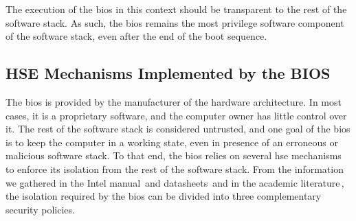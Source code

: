 The execution of the \ac{bios} in this context should be transparent to the rest
of the software stack.
%
As such, the \ac{bios} remains the most privilege software component of the
software stack, even after the end of the boot sequence.

\subsection{HSE Mechanisms Implemented by the BIOS}
\label{subsec:usecase:firm:sec}

The \ac{bios} is provided by the manufacturer of the hardware architecture.
%
In most cases, it is a proprietary software, and the computer owner has little
control over it.
%
The rest of the software stack is considered untrusted, and one goal of the
\ac{bios} is to keep the computer in a working state, even in presence of an
erroneous or malicious software stack.
%
To that end, the \ac{bios} relies on several \ac{hse} mechanisms to enforce its
isolation from the rest of the software stack.
%
%
From the information we gathered in the Intel manual\,\cite{intel2014manual} and
datasheets\,\cite{intel2009mch,intel2012pch} and in the academic
literature\,\cite{bulygin2014summary}, the isolation required by the \ac{bios}
can be divided into three complementary security policies.

